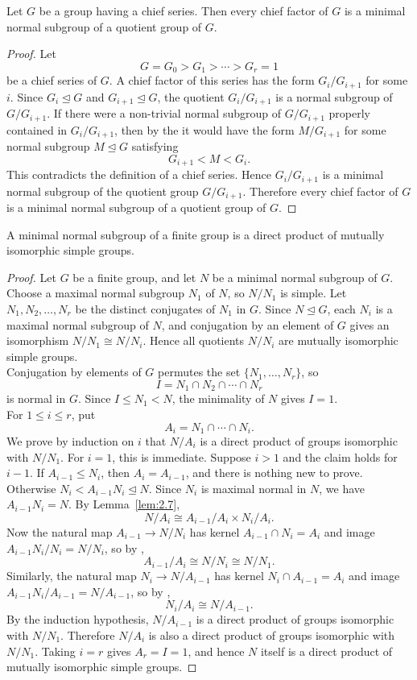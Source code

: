 \documentclass[../Odyssey_Project.tex]{subfiles}
\begin{document}
\begin{lemma}
\label{lem:10.4}
Let $G$ be a group having a chief series. Then every chief factor of $G$ is a minimal normal subgroup of a quotient group of $G$.
\end{lemma}
\begin{proof}
Let
\[
  G=G_0>G_1>\cdots>G_r=1
\]
be a chief series of $G$. A chief factor of this series has the form $G_i/G_{i+1}$ for some $i$. Since $G_i\trianglelefteq G$ and $G_{i+1}\trianglelefteq G$, the quotient $G_i/G_{i+1}$ is a normal subgroup of $G/G_{i+1}$. If there were a non-trivial normal subgroup of $G/G_{i+1}$ properly contained in $G_i/G_{i+1}$, then by the  it would have the form $M/G_{i+1}$ for some normal subgroup $M\trianglelefteq G$ satisfying
\[
  G_{i+1}<M<G_i.
\]
This contradicts the definition of a chief series. Hence $G_i/G_{i+1}$ is a minimal normal subgroup of the quotient group $G/G_{i+1}$. Therefore every chief factor of $G$ is a minimal normal subgroup of a quotient group of $G$.
\end{proof}

\begin{theorem}
\label{thm:10.5}
A minimal normal subgroup of a finite group is a direct product of mutually isomorphic simple groups.
\end{theorem}
\begin{proof}
Let $G$ be a finite group, and let $N$ be a minimal normal subgroup of $G$. Choose a maximal normal subgroup $N_1$ of $N$, so $N/N_1$ is simple. Let $N_1,N_2,\dots,N_r$ be the distinct conjugates of $N_1$ in $G$. Since $N\trianglelefteq G$, each $N_i$ is a maximal normal subgroup of $N$, and conjugation by an element of $G$ gives an isomorphism $N/N_1\cong N/N_i$. Hence all quotients $N/N_i$ are mutually isomorphic simple groups.\\
Conjugation by elements of $G$ permutes the set $\{N_1,\dots,N_r\}$, so
\[
  I=N_1\cap N_2\cap\cdots\cap N_r
\]
is normal in $G$. Since $I\leq N_1<N$, the minimality of $N$ gives $I=1$.\\
For $1\leq i\leq r$, put
\[
  A_i=N_1\cap\cdots\cap N_i.
\]
We prove by induction on $i$ that $N/A_i$ is a direct product of groups isomorphic with $N/N_1$. For $i=1$, this is immediate. Suppose $i>1$ and the claim holds for $i-1$. If $A_{i-1}\leq N_i$, then $A_i=A_{i-1}$, and there is nothing new to prove. Otherwise $N_i<A_{i-1}N_i\trianglelefteq N$. Since $N_i$ is maximal normal in $N$, we have $A_{i-1}N_i=N$. By Lemma~\ref{lem:2.7},
\[
  N/A_i
  \cong
  A_{i-1}/A_i \times N_i/A_i.
\]
Now the natural map $A_{i-1}\to N/N_i$ has kernel $A_{i-1}\cap N_i=A_i$ and image $A_{i-1}N_i/N_i=N/N_i$, so by ,
\[
  A_{i-1}/A_i\cong N/N_i\cong N/N_1.
\]
Similarly, the natural map $N_i\to N/A_{i-1}$ has kernel $N_i\cap A_{i-1}=A_i$ and image $A_{i-1}N_i/A_{i-1}=N/A_{i-1}$, so by ,
\[
  N_i/A_i\cong N/A_{i-1}.
\]
By the induction hypothesis, $N/A_{i-1}$ is a direct product of groups isomorphic with $N/N_1$. Therefore $N/A_i$ is also a direct product of groups isomorphic with $N/N_1$. Taking $i=r$ gives $A_r=I=1$, and hence $N$ itself is a direct product of mutually isomorphic simple groups.
\end{proof}
\end{document}
